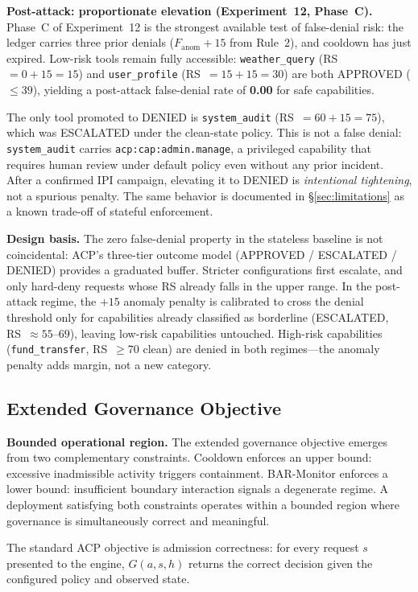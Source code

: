 \documentclass[11pt]{article}
\theoremstyle{definition}
\begin{document}
\textbf{Post-attack: proportionate elevation (Experiment~12, Phase~C).}
Phase~C of Experiment~12 is the strongest available test of false-denial
risk: the ledger carries three prior denials ($F_\text{anom} +15$
from Rule~2), and cooldown has just expired.
Low-risk tools remain fully accessible:
\texttt{weather\_query} (RS~$=0+15=15$) and \texttt{user\_profile}
(RS~$=15+15=30$) are both APPROVED ($\leq 39$), yielding a post-attack
false-denial rate of \textbf{0.00} for safe capabilities.

The only tool promoted to DENIED is \texttt{system\_audit} (RS~$=60+15=75$),
which was ESCALATED under the clean-state policy.
This is not a false denial: \texttt{system\_audit} carries
\texttt{acp:cap:admin.manage}, a privileged capability that requires
human review under default policy even without any prior incident.
After a confirmed IPI campaign, elevating it to DENIED is
\emph{intentional tightening}, not a spurious penalty.
The same behavior is documented in \S\ref{sec:limitations} as a
known trade-off of stateful enforcement.

\textbf{Design basis.}
The zero false-denial property in the stateless baseline is not
coincidental: ACP's three-tier outcome model (APPROVED / ESCALATED / DENIED)
provides a graduated buffer.
Stricter configurations first escalate, and only hard-deny requests whose
RS already falls in the upper range.
In the post-attack regime, the $+15$ anomaly penalty is calibrated to
cross the denial threshold only for capabilities already classified as
borderline (ESCALATED, RS~$\approx 55$--$69$), leaving low-risk capabilities
untouched.
High-risk capabilities (\texttt{fund\_transfer}, RS~$\geq 70$ clean) are
denied in both regimes---the anomaly penalty adds margin, not a new category.

\subsection{Extended Governance Objective}

\textbf{Bounded operational region.}
The extended governance objective emerges from two complementary constraints.
Cooldown enforces an upper bound: excessive inadmissible activity triggers
containment.
BAR-Monitor enforces a lower bound: insufficient boundary interaction signals
a degenerate regime.
A deployment satisfying both constraints operates within a bounded region
where governance is simultaneously correct and meaningful.

The standard ACP objective is admission correctness: for every request $s$
presented to the engine, $G(a, s, h)$ returns the correct decision given
the configured policy and observed state.
\end{document}
